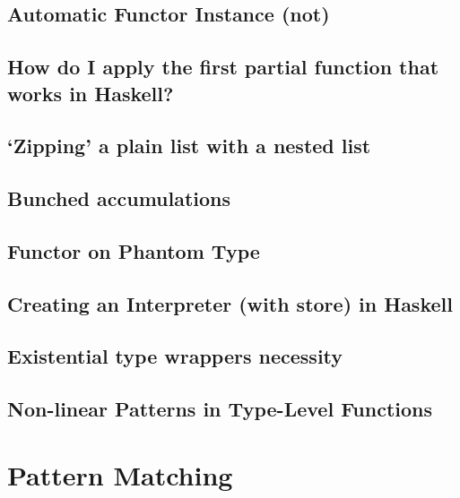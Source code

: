\documentclass{book}%
\begin{document}
\section{Automatic Functor Instance (not)}


\section{How do I apply the first partial function that works in Haskell?}


\section{`Zipping' a plain list with a nested list}


\section{Bunched accumulations}


\section{Functor on Phantom Type}


\section{Creating an Interpreter (with store) in Haskell}


\section{Existential type wrappers necessity}


\section{Non-linear Patterns in Type-Level Functions}



\chapter{Pattern Matching}
\end{document}
